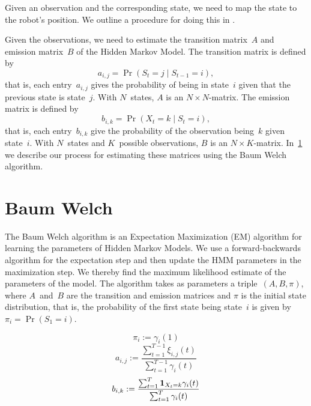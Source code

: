 \documentclass[twoside]{article}
\begin{document}
Given an observation and the corresponding state, we need to map the state to the robot's position.
We outline a procedure for doing this in . %

Given the observations, we need to estimate the transition matrix~$A$ and emission matrix~$B$ of the Hidden Markov Model.
The transition matrix is defined by
\begin{equation*}
  a_{i,j} = \Pr(S_{t} = j \mid S_{t-1} = i),
\end{equation*}
that is, each entry~$a_{i, j}$ gives the probability of being in state~$i$ given that the previous state is state~$j$.
With $N$~states, $A$ is an ${N \times N}$-matrix.
The emission matrix is defined by
\begin{equation*}
  b_{i, k} = \Pr(X_t = k \mid S_t = i),
\end{equation*}
that is, each entry~$b_{i, k}$ give the probability of the observation being~$k$ given state~$i$.
With $N$~states and $K$~possible observations, $B$ is an ${N \times K}$-matrix.
In~\cref{sec:baum-welch} we describe our process for estimating these matrices using the Baum Welch algorithm.

\section{Baum Welch}\label{sec:baum-welch}

The Baum Welch algorithm is an Expectation Maximization (EM) algorithm for learning the parameters of Hidden Markov Models.
We use a forward-backwards algorithm for the expectation step and then update the HMM parameters in the maximization step.
We thereby find the maximum likelihood estimate of the parameters of the model.
The algorithm takes as parameters a triple~$(A, B, \pi)$, where $A$~and~$B$ are the transition and emission matrices and $\pi$ is the initial state distribution, that is, the probability of the first state being state~$i$ is given by ${\pi_i = \Pr(S_1 = i)}$.


\begin{equation*}
  \pi_i := \gamma_i(1)
\end{equation*}
\begin{equation*}
  a_{i, j} := \frac{\sum_{t=1}^{T-1}\xi_{i, j}(t)}{\sum_{t=1}^{T-1}\gamma_i(t)}
\end{equation*}
\begin{equation*}
  b_{i,k} := \frac{\sum_{t=1}^T \1_{X_t = k}\gamma_i(t)}{\sum_{t=1}^T \gamma_i(t)} %
\end{equation*}
\end{document}
